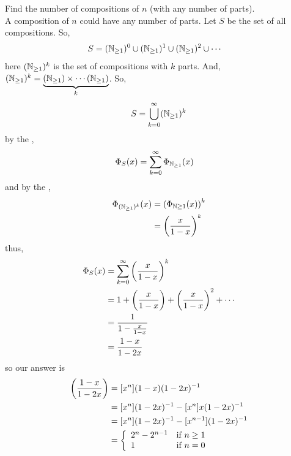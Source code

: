 \documentclass[english, 11pt]{article}
\begin{document}
   \begin{exmp}
     Find the number of compositions of $n$ (with any number of parts). \\

     A composition of $n$ could have any number of parts. Let $S$ be the set of all compositions. So,
     \begin{align*}
       S & = ({\mathbb{N}}_{\geq 1})^0 \cup ({\mathbb{N}}_{\geq 1})^1 \cup ({\mathbb{N}}_{\geq 1})^2 \cup \cdots
     \end{align*}
     here $({\mathbb{N}}_{\geq 1})^k$ is the set of compositions with $k$ parts. And, $({\mathbb{N}}_{\geq 1})^k = \underbrace{({\mathbb{N}}_{\geq 1}) \times \cdots ({\mathbb{N}}_{\geq 1})}_k$. So,
     \begin{align*}
       S = \bigcup_{k=0}^{\infty} ({\mathbb{N}}_{\geq 1})^k
     \end{align*}
     by the ,
     \begin{align*}
       \Phi_S(x) & = \sum_{k =0}^{\infty} \Phi_{{\mathbb{N}}_{\geq 1}}(x)
     \end{align*}
     and by the ,
     \begin{align*}
       \Phi_{({\mathbb{N}}_{\geq 1})^k}(x) & = \left( \Phi_{{\mathbb{N}} \geq 1}(x) \right)^k \\
       & = \left( \frac{x}{1-x} \right)^k
     \end{align*}
     thus,
     \begin{align*}
       \Phi_S(x) & = \sum_{k =0}^{\infty} \left(\frac{x}{1-x}\right)^k \\
       & = 1 + \left(\frac{x}{1-x}\right) + \left(\frac{x}{1-x}\right)^2 + \cdots \\
       & = \frac{1}{1- \frac{x}{1-x}} \\
       & = \frac{1-x}{1-2x}
     \end{align*}
     so our answer is
     \begin{align*}
       [x^n]\left(\f{1-x}{1-2x}\right) & = [x^{n}] (1-x)(1-2x)^{-1} \\
       & = [x^n] (1-2x)^{-1} - [x^n] x(1-2x)^{-1} \\
       & = [x^n] (1-2x)^{-1} - [x^{n-1}](1-2x)^{-1} \\
       & = \piecewise{2^n - 2^{n-1}}{if $n \geq 1$}{1}{if $n = 0$}
     \end{align*}
   \end{exmp}
\end{document}
